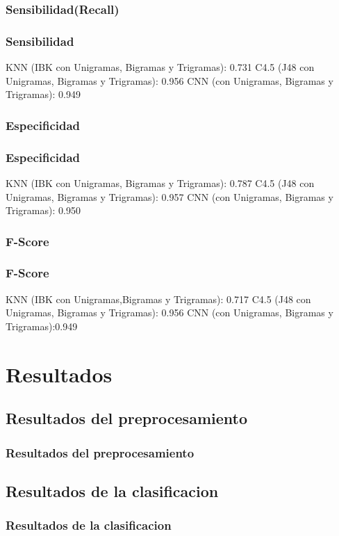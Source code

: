 \documentclass{beamer}
\begin{document}
\subsubsection{Sensibilidad(Recall)}
\begin{frame}
\frametitle{Sensibilidad}
KNN (IBK con Unigramas, Bigramas y Trigramas): 0.731
C4.5 (J48 con Unigramas, Bigramas y Trigramas): 0.956
CNN (con Unigramas, Bigramas y Trigramas): 0.949 
\end{frame}
\subsubsection{Especificidad}
\begin{frame}
\frametitle{Especificidad}
KNN (IBK con Unigramas, Bigramas y Trigramas): 0.787
C4.5 (J48 con Unigramas, Bigramas y Trigramas): 0.957
CNN (con Unigramas, Bigramas y Trigramas): 0.950
\end{frame}
\subsubsection{F-Score}
\begin{frame}
\frametitle{F-Score}
KNN (IBK con Unigramas,Bigramas y Trigramas): 0.717
C4.5 (J48 con Unigramas, Bigramas y Trigramas): 0.956
CNN (con Unigramas, Bigramas y Trigramas):0.949
\end{frame}



\section{Resultados}


\subsection{Resultados del preprocesamiento}
\begin{frame}
\frametitle{Resultados del preprocesamiento}
\end{frame}


\subsection{Resultados de la clasificacion}
\begin{frame}
\frametitle{Resultados de la clasificacion}
\end{frame}
\end{document}

